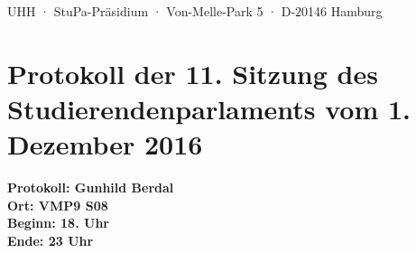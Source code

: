 \documentclass[ngerman,headheight=70pt]{scrartcl}
\begin{document}
    UHH · StuPa-Präsidium · Von-Melle-Park 5 · D-20146 Hamburg

    \section*{Protokoll der 11. Sitzung des Studierendenparlaments vom 1. Dezember 2016}

    \textbf{Protokoll: Gunhild Berdal}\\
    \textbf{Ort: VMP9 S08}\\
    \textbf{Beginn: 18. Uhr}\\
    \textbf{Ende: 23 Uhr}

    \vspace{0.5cm}
\end{document}
